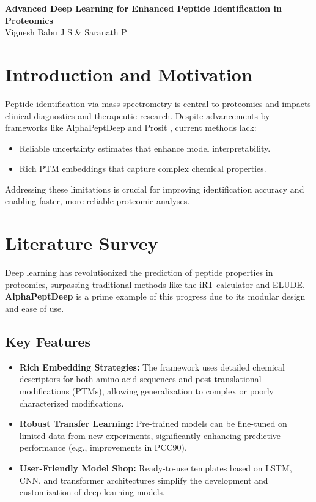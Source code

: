 \documentclass[10pt]{article}
\begin{document}
\begin{center}
{\Large \textbf{Advanced Deep Learning for Enhanced Peptide Identification in Proteomics}}\\[0.5em]
Vignesh Babu J S \& Saranath P\\[0.5em]

\end{center}



\section*{Introduction and Motivation}
Peptide identification via mass spectrometry is central to proteomics and impacts clinical diagnostics and therapeutic research. Despite advancements by frameworks like AlphaPeptDeep \cite{AlphaPeptDeep} and Prosit \cite{PrositRef}, current methods lack:
\begin{itemize}[noitemsep]
    \item Reliable uncertainty estimates that enhance model interpretability.
    \item Rich PTM embeddings that capture complex chemical properties.
\end{itemize}
Addressing these limitations is crucial for improving identification accuracy and enabling faster, more reliable proteomic analyses.

\section*{Literature Survey}

Deep learning has revolutionized the prediction of peptide properties in proteomics, surpassing traditional methods like the iRT-calculator and ELUDE. \textbf{AlphaPeptDeep} \cite{AlphaPeptDeep} is a prime example of this progress due to its modular design and ease of use.

\subsection*{Key Features}
\begin{itemize}[noitemsep]
    \item \textbf{Rich Embedding Strategies:} 
          The framework uses detailed chemical descriptors for both amino acid sequences and post-translational modifications (PTMs), allowing generalization to complex or poorly characterized modifications.
    \item \textbf{Robust Transfer Learning:} 
          Pre-trained models can be fine-tuned on limited data from new experiments, significantly enhancing predictive performance (e.g., improvements in PCC90).
    \item \textbf{User-Friendly Model Shop:} 
          Ready-to-use templates based on LSTM, CNN, and transformer architectures simplify the development and customization of deep learning models.
\end{itemize}
\end{document}
